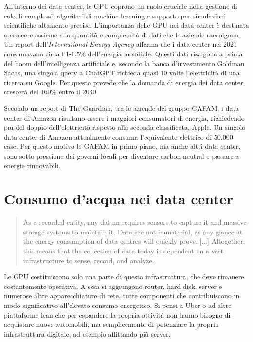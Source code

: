 \documentclass[12pt,a4paper,oneside]{book}
\begin{document}
All'interno dei data center, le GPU coprono un ruolo cruciale nella gestione di calcoli complessi, algoritmi di machine learning e supporto per simulazioni scientifiche altamente precise. L'importanza delle GPU nei data center è destinata a crescere assieme alla quantità e complessità di dati che le aziende raccolgono. Un report dell'\textit{International Energy Agency} afferma che i data center nel 2021 consumavano circa l'1-1.5\% dell'energia mondiale. Questi dati risalgono a prima del boom dell'intelligenza artificiale e, secondo la banca d'investimento Goldman Sachs, una singola query a ChatGPT richieda quasi 10 volte l'elettricità di una ricerca su Google. Per questo prevede che la domanda di energia dei data center crescerà del 160\% entro il 2030.

Secondo un report di The Guardian\cite{guardian2024datacenters}, tra le aziende del gruppo GAFAM, i data center di Amazon risultano essere i maggiori consumatori di energia, richiedendo più del doppio dell'elettricità rispetto alla seconda classificata, Apple. Un singolo data center di Amazon attualmente consuma l'equivalente elettrico di 50.000 case. Per questo motivo le GAFAM in primo piano, ma anche altri data center, sono sotto pressione dai governi locali per diventare carbon neutral e passare a energie rinnovabili.

\chapter{Consumo d'acqua nei data center}

\begin{quote}
\small
As a recorded entity, any datum requires sensors to capture it and massive storage systems to maintain it. Data are not immaterial, as any glance at the energy consumption of data centres will quickly prove. [...] Altogether, this means that the collection of data today is dependent on a vast infrastructure to sense, record, and analyze.\citep[p.28]{srnicek2017platform}
\end{quote}

Le GPU costituiscono solo una parte di questa infrastruttura, che deve rimanere costantemente operativa. A essa si aggiungono router, hard disk, server e numerose altre apparecchiature di rete, tutte componenti che contribuiscono in modo significativo all'elevato consumo energetico. Si pensi a Uber o ad altre piattaforme lean che per espandere la propria attività non hanno bisogno di acquistare nuove automobili, ma semplicemente di potenziare la propria infrastruttura digitale, ad esempio affittando più server. \citep[p.31]{srnicek2017platform}
\end{document}
